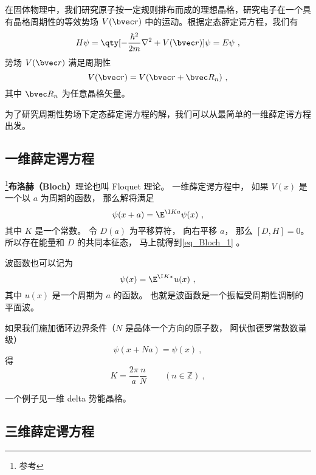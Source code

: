 
\begin{issues}
\issueDraft
\end{issues}


在固体物理中，我们研究原子按一定规则排布而成的理想晶格，研究电子在一个具有晶格周期性的等效势场 $V(\bvec r)$ 中的运动。根据定态薛定谔方程，我们有
\begin{equation}
H\psi=\qty[-\frac{\hbar^2}{2m}\nabla^2+V(\bvec r)] \psi = E\psi~,
\end{equation}
势场 $V(\bvec r)$ 满足周期性
\begin{equation}
V(\bvec r)=V(\bvec r+\bvec R_n)~,
\end{equation}
其中 $\bvec R_n$ 为任意晶格矢量。

为了研究周期性势场下定态薛定谔方程的解，我们可以从最简单的一维薛定谔方程出发。

\subsection{一维薛定谔方程}
\footnote{参考\cite{GriffQ}}\textbf{布洛赫（Bloch）}理论也叫 Floquet 理论。 一维薛定谔方程中， 如果 $V(x)$ 是一个以 $a$ 为周期的函数， 那么解将满足
\begin{equation}\label{eq_Bloch_1}
\psi(x+a) = \E^{\I K a}\psi(x)~,
\end{equation}
其中 $K$ 是一个常数。 令 $D(a)$ 为平移算符， 向右平移 $a$， 那么 $[D,H] = 0$。 所以存在能量和 $D$ 的共同本征态， 马上就得到\autoref{eq_Bloch_1} 。

波函数也可以记为
\begin{equation}
\psi(x) = \E^{\I K x} u(x)~,
\end{equation}
其中 $u(x)$ 是一个周期为 $a$ 的函数。 也就是波函数是一个振幅受周期性调制的平面波。

如果我们施加循环边界条件（$N$ 是晶体一个方向的原子数， 阿伏伽德罗常数数量级）
\begin{equation}
\psi(x+Na) = \psi(x)~,
\end{equation}
得
\begin{equation}
K = \frac{2\pi}{a} \frac{n}{N} \qquad (n \in \mathbb Z)~,
\end{equation}

一个例子见一维 delta 势能晶格。

\subsection{三维薛定谔方程}

